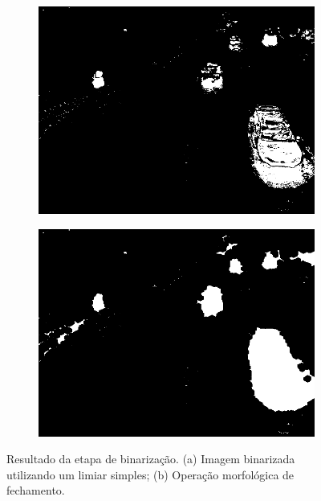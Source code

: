 \begin{figure}[ht]
  \begin{center}
    \begin{subfigure}[b]{.49\textwidth}
      \begin{center}
        \includegraphics[width=1\linewidth]{imgs/bin.png}
      \end{center}
      \caption{}
      \label{fig:bin}
    \end{subfigure}
    \begin{subfigure}[b]{.49\textwidth}
      \begin{center}
        \includegraphics[width=1\linewidth]{imgs/morph.png}
      \end{center}
      \caption{}
      \label{fig:morph}
    \end{subfigure}
  \end{center}
  \caption{Resultado da etapa de binarização. (a) Imagem binarizada utilizando um limiar simples; (b) Operação morfológica de fechamento.}
  \label{fig:bin_morph}
\end{figure}

